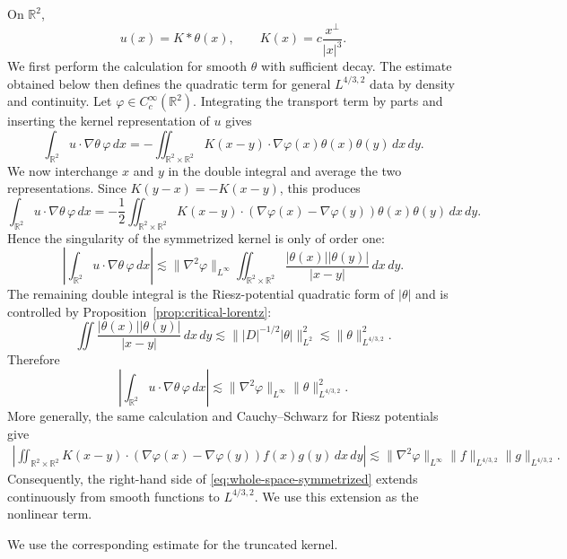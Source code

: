 \documentclass[11pt,reqno]{amsproc}
\newcommand{\R}{\mathbb R}
\newcommand{\dd}{\,d}
\begin{document}
On $\R^2$,
\[
  u(x)=K*\theta(x),
  \qquad
  K(x)=c\frac{x^\perp}{|x|^3}.
\]
We first perform the calculation for smooth $\theta$ with sufficient decay.
The estimate obtained below then defines the quadratic term for general
$L^{4/3,2}$ data by density and continuity.
Let $\varphi\in C_c^\infty(\R^2)$.  Integrating the transport term by parts
and inserting the kernel representation of $u$ gives
\[
  \int_{\R^2}u\cdot\nabla\theta\,\varphi\dd x
  =-
  \iint_{\R^2\times\R^2}
  K(x-y)\cdot\nabla\varphi(x)\theta(x)\theta(y)\dd x\dd y.
\]
We now interchange $x$ and $y$ in the double integral and average the two
representations.  Since $K(y-x)=-K(x-y)$, this produces
\begin{equation}\label{eq:whole-space-symmetrized}
  \int_{\R^2}u\cdot\nabla\theta\,\varphi\dd x
  =-\frac12
  \iint_{\R^2\times\R^2}
  K(x-y)\cdot(\nabla\varphi(x)-\nabla\varphi(y))
  \theta(x)\theta(y)\dd x\dd y.
\end{equation}
Hence the singularity of the symmetrized kernel is only of order one:
\begin{equation}\label{eq:whole-space-nonlinear-bound}
  \left|\int_{\R^2}u\cdot\nabla\theta\,\varphi\dd x\right|
  \lesssim
  \|\nabla^2\varphi\|_{L^\infty}
  \iint_{\R^2\times\R^2}
  \frac{|\theta(x)||\theta(y)|}{|x-y|}\dd x\dd y.
\end{equation}
The remaining double integral is the Riesz-potential quadratic form of
$|\theta|$ and is controlled by Proposition~\ref{prop:critical-lorentz}:
\[
  \iint\frac{|\theta(x)||\theta(y)|}{|x-y|}\dd x\dd y
  \lesssim
  \||D|^{-1/2}|\theta|\|_{L^2}^2
  \lesssim
  \|\theta\|_{L^{4/3,2}}^2.
\]
Therefore
\begin{equation}\label{eq:time-bound-whole}
  \left|\int_{\R^2}u\cdot\nabla\theta\,\varphi\dd x\right|
  \lesssim
  \|\nabla^2\varphi\|_{L^\infty}
  \|\theta\|_{L^{4/3,2}}^2.
\end{equation}
More generally, the same calculation and
Cauchy--Schwarz for Riesz potentials give
\[
\begin{aligned}
  \left|
  \iint_{\R^2\times\R^2}
  K(x-y)\cdot(\nabla\varphi(x)-\nabla\varphi(y))
  f(x)g(y)\dd x\dd y
  \right| \lesssim
  \|\nabla^2\varphi\|_{L^\infty}
  \|f\|_{L^{4/3,2}}\|g\|_{L^{4/3,2}}.
\end{aligned}
\]
Consequently, the right-hand side of
\eqref{eq:whole-space-symmetrized} extends continuously from smooth functions
to $L^{4/3,2}$.  We use this extension as the nonlinear term.

We use the corresponding estimate for the truncated kernel.
\end{document}

